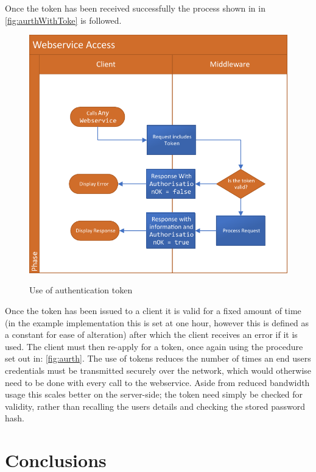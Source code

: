 Once the token has been received successfully the process shown in in \autoref{fig:aurthWithToke} is followed.

 \begin{figure}[!htbp]
\myfloatalign
{\includegraphics[width=\linewidth]{gfx/MiddlewareAurthenticationWithToken}} 
\caption{Use of authentication token}
\label{fig:aurthWithToke}
\end{figure}

Once the token has been issued to a client it is valid for a fixed amount of time (in the example implementation this is set at one hour, however this is defined as a constant for ease of alteration) after which the client receives an error if it is used. The client must then re-apply for a token, once again using the procedure set out in: \autoref{fig:aurth}. The use of tokens reduces the number of times an end users credentials must be transmitted securely over the network, which would otherwise need to be done with every call to the webservice. Aside from reduced bandwidth usage this scales better on the server-side; the token need simply be checked for validity, rather than recalling the users details and checking the stored password hash.

\vfill
\section{Conclusions}

